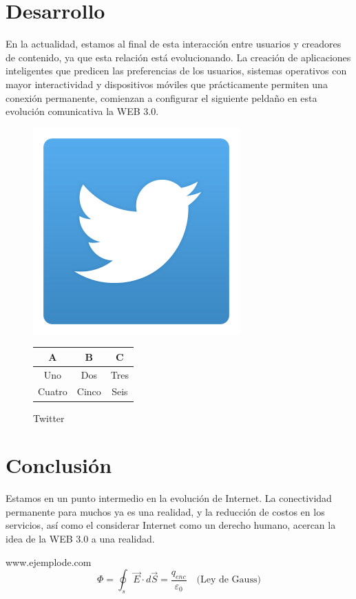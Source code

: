\documentclass[a4paper,11pt]{article}
\begin{document}
\section{Desarrollo} 

En la actualidad, estamos al final de esta interacción entre usuarios  y creadores de contenido, ya que esta relación está evolucionando. La creación de aplicaciones inteligentes que predicen las preferencias de los usuarios, sistemas operativos con mayor interactividad y dispositivos móviles que prácticamente permiten una conexión permanente,  comienzan a configurar el siguiente peldaño en esta evolución comunicativa la  WEB 3.0.






\begin{figure}[t]
\begin{center} 
\bigskip
\includegraphics[height=0.25\textwidth]{twitter.png} \hspace{5mm}
\begin{tabular}[b]{|c|c|c|}
\hline
A & B & C  \\ \hline
Uno & Dos & Tres \\
Cuatro & Cinco & Seis \\ \hline
\end{tabular}
\end{center}
\vspace{-5mm}
\caption{Twitter}
\label{tux}
\end{figure}

\section{Conclusión}
Estamos en un punto intermedio en la evolución de Internet. La conectividad permanente para muchos ya es una realidad, y la reducción de  costos en los servicios, así como el considerar Internet como un derecho humano, acercan la idea de la WEB 3.0 a una realidad.





\begin{thebibliography}{99}
 www.ejemplode.com
 \begin{equation}
\Phi = \oint_s \vec E \cdot d\vec S = 
\frac{q_{enc}}{\varepsilon_0} \quad \text{(Ley de Gauss)}
\end{equation}

\end{thebibliography}
\end{document}
